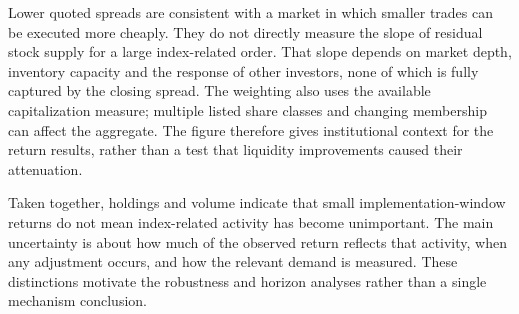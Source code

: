 Lower quoted spreads are consistent with a market in which smaller trades can be executed more cheaply. They do not directly measure the slope of residual stock supply for a large index-related order. That slope depends on market depth, inventory capacity and the response of other investors, none of which is fully captured by the closing spread. The weighting also uses the available capitalization measure; multiple listed share classes and changing membership can affect the aggregate. The figure therefore gives institutional context for the return results, rather than a test that liquidity improvements caused their attenuation.

Taken together, holdings and volume indicate that small implementation-window returns do not mean index-related activity has become unimportant. The main uncertainty is about how much of the observed return reflects that activity, when any adjustment occurs, and how the relevant demand is measured. These distinctions motivate the robustness and horizon analyses rather than a single mechanism conclusion.
\FloatBarrier
